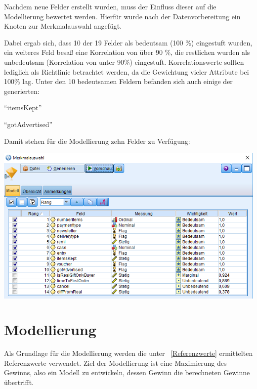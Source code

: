 \documentclass[a4paper,12pt]{article}
\begin{document}
Nachdem neue Felder erstellt wurden, muss der Einfluss dieser auf die Modellierung bewertet werden.
Hierfür wurde nach der Datenvorbereitung  ein Knoten zur Merkmalauswahl angefügt.

Dabei ergab sich, dass 10 der 19 Felder als bedeutsam (100 \%) eingestuft wurden, ein weiteres Feld besaß eine Korrelation von über 90 \%,
die restlichen wurden als unbedeutsam (Korrelation von unter 90\%) eingestuft.
Korrelationswerte sollten lediglich als Richtlinie betrachtet werden, da die Gewichtung
vieler Attribute bei 100\% lag.  Unter den 10 bedeutsamen Feldern befanden sich auch einige der
generierten:

\vspace{0.2cm}
\par
	\begin{minipage}[h]{.5\textwidth}
	\begin{center}
	"`itemsKept"'
	\end{center}
	\end{minipage}
	\hfill
	\begin{minipage}[h]{.5\textwidth}
	\begin{center}
	"`gotAdvertised"'
	\end{center}
	\end{minipage}
	\vspace{0.2cm}
\par
Damit stehen für die Modellierung zehn Felder zu Verfügung:
\begin{center}
\includegraphics[width=\textwidth]{Screens/Merkmalauswahl}
\end{center}

\section{Modellierung}
Als Grundlage für die Modellierung werden die unter ~\ref{Referenzwerte} ermittelten Referenzwerte verwendet. Ziel der Modellierung ist eine Maximierung des Gewinns, also ein Modell zu entwickeln, dessen Gewinn die berechneten Gewinne übertrifft.  
\end{document}
